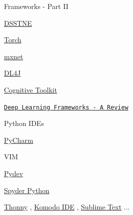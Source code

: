 \documentclass[12pt,t]{beamer}
\begin{document}
\begin{frame}[c]{Frameworks - Part II}

\pause

\href{https://github.com/amzn/amazon-dsstne}{DSSTNE}
\pause

\href{http://torch.ch/}{Torch}
\pause

\href{https://github.com/dmlc/mxnet}{mxnet}
\pause

\href{https://deeplearning4j.org/}{DL4J}
\pause

\href{https://github.com/Microsoft/CNTK}{Cognitive Toolkit}
\pause

\hfill
{\footnotesize \lolit
\href{https://medium.com/@ricardo.guerrero/deep-learning-frameworks-a-review-before-finishing-2016-5b3ab4010b06}{\tt Deep Learning Frameworks - A Review}
}

\end{frame}


\begin{frame}[c]{Python IDEs}

\pause

\href{https://www.jetbrains.com/pycharm/}{PyCharm}
\pause

VIM
\pause

\href{http://www.pydev.org/}{Pydev}
\pause

\href{https://pythonhosted.org/spyder/}{Spyder Python}
\pause

\href{http://thonny.org/}{Thonny}  \pause , \href{https://www.activestate.com/komodo-ide}{Komodo IDE} \pause , \href{https://www.sublimetext.com/3}{Sublime Text} \pause ...

\end{frame}
\end{document}
